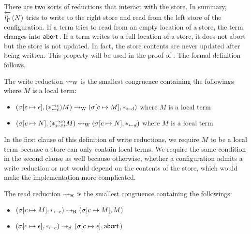 {There are two sorts of reductions that interact with the store.
In summary, $\rtol i l \Gamma N$ tries to write to the right store and read from
the left store of the configuration.
If a term tries to read from an empty location of a store,
the term changes into $\abort$.  If a term writes to a full location of
a store, it does not abort but the store is not updated.  In fact, the
store contents are never updated after being written.
This property will be used in the proof of .
The formal definition follows.
\begin{definition}
 The write reduction $\wreduce$ is the smallest congruence
 containing the followings where $M$ is a local term:
 \begin{itemize}
  \item $\conf{[c\mapsto \epsilon]}{(\comodR)M} \wreduce
	\conf{[c\mapsto M]}{\reader d}
	$ where $M$ is a local term
  \item $\conf{[c\mapsto N]}{(\comodR) M} \wreduce \conf{[c\mapsto
	N]}{\reader d}$ where $M$ is a local term
 \end{itemize}
\end{definition}
In the first clause of this definition of write reductions, we require
$M$ to be a local
term because a store can only contain local terms.
We require the same condition in the second clause as well because
otherwise, whether a configuration admits a write reduction or not
would depend on the contents of the store, which would make the
implementation more complicated.

\begin{definition}
 \label{read}
 The read reduction $\rreduce$ is the smallest congruence
 containing the
 followings:
\begin{itemize}
 \item $\conf{[c\mapsto M]}{\reader c}\rreduce \conf{[c\mapsto M]}{M}$
 \item $\conf{[c\mapsto \epsilon]}{\reader c} \rreduce \conf{[c\mapsto \epsilon]}{\abort}$
\end{itemize}
\end{definition}

}
